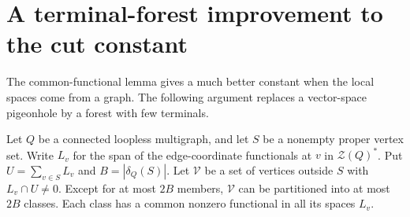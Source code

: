 \section{A terminal-forest improvement to the cut constant}
\label{sec:terminal-forest-cut-constant}

The common-functional lemma gives a much better constant when the local spaces come from a graph.
The following argument replaces a vector-space pigeonhole by a forest with few terminals.

\begin{lemma}
\label{lem:local-terminal-intersection}
Let $Q$ be a connected loopless multigraph, and let $S$ be a nonempty proper vertex set.
Write $L_v$ for the span of the edge-coordinate functionals at $v$ in $\mathcal Z(Q)^*$.
Put $U=\sum_{v\in S}L_v$ and $B=|\delta_Q(S)|$.
Let $\mathcal V$ be a set of vertices outside $S$ with $L_v\cap U\ne0$.
Except for at most $2B$ members, $\mathcal V$ can be partitioned into at most $2B$ classes.
Each class has a common nonzero functional in all its spaces $L_v$.
\end{lemma}

